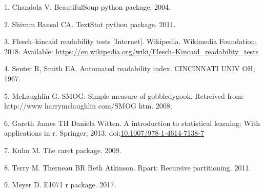 \documentclass[10pt,letterpaper]{article}
\begin{document}
\hypertarget{refs}{}
\leavevmode\hypertarget{ref-BeautifulSoup}{}%
1. Chandola V. BeautifulSoup python package. 2004.

\leavevmode\hypertarget{ref-textstat}{}%
2. Shivam Bansal CA. TextStat python package. 2011.

\leavevmode\hypertarget{ref-wikipedia_2018}{}%
3. Flesch--kincaid readability tests {[}Internet{]}. Wikipedia.
Wikimedia Foundation; 2018. Available:
\url{https://en.wikipedia.org/wiki/Flesch–Kincaid_readability_tests}

\leavevmode\hypertarget{ref-senter1967automated}{}%
4. Senter R, Smith EA. Automated readability index. CINCINNATI UNIV OH;
1967.

\leavevmode\hypertarget{ref-mclaughlin2008smog}{}%
5. McLaughlin G. SMOG: Simple measure of gobbledygook. Retreived from:
http://www harrymclaughlin com/SMOG htm. 2008;

\leavevmode\hypertarget{ref-MLbook}{}%
6. Gareth James TH Daniela Witten. A introduction to statistical
learning: With applications in r. Springer; 2013.
doi:\href{https://doi.org/10.1007/978-1-4614-7138-7}{10.1007/978-1-4614-7138-7}

\leavevmode\hypertarget{ref-Kuhn09thecaret}{}%
7. Kuhn M. The caret package. 2009.

\leavevmode\hypertarget{ref-rpart}{}%
8. Terry M. Therneau BR Beth Atkinson. Rpart: Recursive partitioning.
2011.

\leavevmode\hypertarget{ref-e1071}{}%
9. Meyer D. E1071 r package. 2017.

\nolinenumbers
\end{document}
